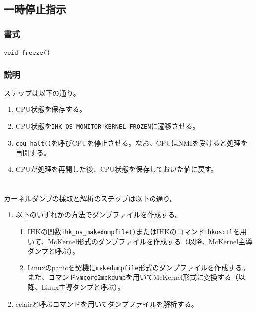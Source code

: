 \documentclass[twoside,11pt,fleqn]{book}
\begin{document}
\subsection{一時停止指示}
\subsubsection*{書式}{\quad} \texttt{void freeze()}
\subsubsection*{説明}{\quad} 
ステップは以下の通り。
\begin{enumerate}
\item CPU状態を保存する。
\item CPU状態を\texttt{IHK\_OS\_MONITOR\_KERNEL\_FROZEN}に遷移させる。
\item \texttt{cpu\_halt()}を呼びCPUを停止させる。なお、CPUはNMIを受けると処理を再開する。
\item CPUが処理を再開した後、CPU状態を保存しておいた値に戻す。
\end{enumerate}

\section{}\label{sec:kdump}
カーネルダンプの採取と解析のステップは以下の通り。
\begin{enumerate}
\item 以下のいずれかの方法でダンプファイルを作成する。
\begin{enumerate}
\item IHKの関数\texttt{ihk\_os\_makedumpfile()}またはIHKのコマンド\texttt{ihkosctl}を用いて、McKernel形式のダンプファイルを作成する（以降、McKernel主導ダンプと呼ぶ）。
\item Linuxのpanicを契機に\texttt{makedumpfile}形式のダンプファイルを作成する。また、コマンド\texttt{vmcore2mckdump}を用いてMcKernel形式に変換する（以降、Linux主導ダンプと呼ぶ）。
\end{enumerate}
\item eclairと呼ぶコマンドを用いてダンプファイルを解析する。
\end{enumerate}
\end{document}
